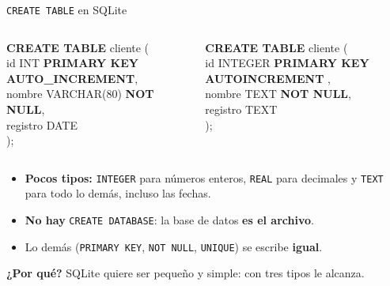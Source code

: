 \documentclass[aspectratio=169,10pt,c]{beamer}
\newcommand{\kw}[1]{\textcolor{utpRojo}{\textbf{#1}}}
\newcommand{\nuevo}[1]{{%
  \setlength{\fboxsep}{1.2pt}%
  \begingroup
  \renewcommand{\kw}[1]{\textcolor{utpNegro}{\textbf{##1}}}%
  \colorbox{yellow!45}{\textcolor{utpNegro}{#1}}%
  \endgroup}}
\newcommand{\etiqueta}[1]{\tikz[baseline=-0.5ex]{\node[rounded corners=2pt,fill=utpNegro,text=white,
  font=\bfseries\scriptsize,inner xsep=6pt,inner ysep=3pt] {#1};}}
\newenvironment{sqlcode}[1][.86\textwidth]
  {\begin{center}\begin{lrbox}{\sqlbuf}\begin{minipage}{#1}\ttfamily\footnotesize\vspace{6pt}\raggedright}
  {\vspace{6pt}\end{minipage}\end{lrbox}\colorbox{utpGrisClaro}{\usebox{\sqlbuf}}\end{center}}
\newcommand{\ind}{\hspace*{1.6em}}
\begin{document}
\begin{frame}{\texttt{CREATE TABLE} en SQLite}
\begin{columns}[T,onlytextwidth]
\centering\etiqueta{MySQL}
\begin{sqlcode}[\textwidth]
\scriptsize
\kw{CREATE TABLE} cliente (\\
\ind id INT \kw{PRIMARY KEY} \kw{AUTO\_INCREMENT},\\
\ind nombre VARCHAR(80) \kw{NOT NULL},\\
\ind registro DATE\\
);
\end{sqlcode}
\centering\etiqueta{SQLite}
\begin{sqlcode}[\textwidth]
\scriptsize
\kw{CREATE TABLE} cliente (\\
\ind id \nuevo{INTEGER} \kw{PRIMARY KEY} \nuevo{\kw{AUTOINCREMENT}},\\
\ind nombre \nuevo{TEXT} \kw{NOT NULL},\\
\ind registro \nuevo{TEXT}\\
);
\end{sqlcode}
\end{columns}
\vspace{0.1cm}
\begin{itemize}\setlength\itemsep{6pt}
  \item \textbf{Pocos tipos:} \texttt{INTEGER} para números enteros, \texttt{REAL} para decimales y \texttt{TEXT} para todo lo demás, incluso las fechas.
  \item \textbf{No hay} \texttt{CREATE DATABASE}: la base de datos \textbf{es el archivo}.
  \item Lo demás (\texttt{PRIMARY KEY}, \texttt{NOT NULL}, \texttt{UNIQUE}) se escribe \textbf{igual}.
\end{itemize}
\vspace{0.15cm}
\small\color{utpGris} \textbf{¿Por qué?} SQLite quiere ser pequeño y simple: con tres tipos le alcanza.
\end{frame}
\end{document}
